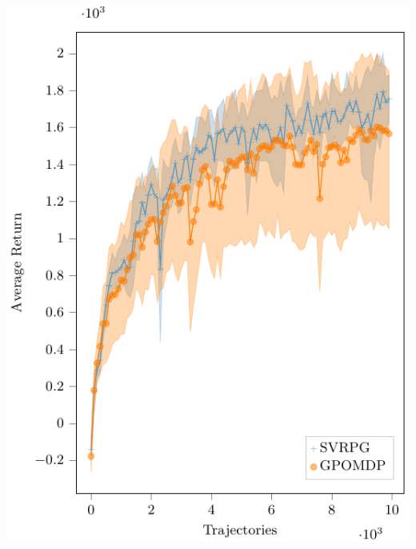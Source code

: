 \documentclass[aspectratio=169]{beamer}
\begin{document}
\begin{frame}
\begin{minipage}[t]{.28\paperwidth}
\includegraphics[width=\textwidth]{images/cheetah.pdf}
\end{minipage}


\end{frame}
\end{document}
